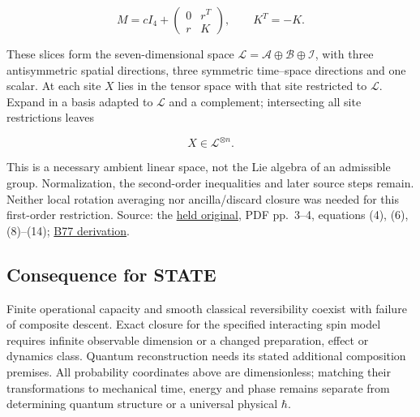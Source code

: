 \documentclass[11pt,a4paper]{article}
\begin{document}
\[M=cI_4+\begin{pmatrix}0&r^T\\r&K\end{pmatrix},\qquad K^T=-K.\]

These slices form the seven-dimensional space
\(\mathcal L=\mathcal A\oplus\mathcal B\oplus\mathcal I\), with three
antisymmetric spatial directions, three symmetric time--space directions
and one scalar. At each site \(X\) lies in the tensor space with that
site restricted to \(\mathcal L\). Expand in a basis adapted to
\(\mathcal L\) and a complement; intersecting all site restrictions
leaves

\[X\in\mathcal L^{\otimes n}.\]

This is a necessary ambient linear space, not the Lie algebra of an
admissible group. Normalization, the second-order inequalities and later
source steps remain. Neither local rotation averaging nor
ancilla/discard closure was needed for this first-order restriction.
Source: the
\href{../docs/batches/B70/de-la-Torre-Masanes-Short-Mueller-2011.pdf}{held
original}, PDF pp.~3--4, equations (4), (6), (8)--(14);
\href{classical-orientation-closure.md}{B77 derivation}.

\hypertarget{consequence-for-state}{%
\subsection{Consequence for STATE}\label{consequence-for-state}}

Finite operational capacity and smooth classical reversibility coexist
with failure of composite descent. Exact closure for the specified
interacting spin model requires infinite observable dimension or a
changed preparation, effect or dynamics class. Quantum reconstruction
needs its stated additional composition premises. All probability
coordinates above are dimensionless; matching their transformations to
mechanical time, energy and phase remains separate from determining
quantum structure or a universal physical \(\hbar\).
\end{document}
